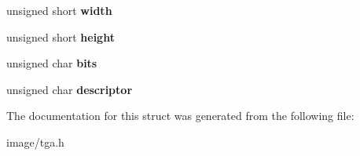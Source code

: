 \begin{DoxyCompactItemize}
\item 
\hypertarget{structnih_1_1_t_g_a_header_ae261168d8904db36be4e1acf3498a040}{
unsigned short {\bfseries width}}
\label{structnih_1_1_t_g_a_header_ae261168d8904db36be4e1acf3498a040}

\item 
\hypertarget{structnih_1_1_t_g_a_header_ab8bd1d1e1917c727c92cfedf641b8edb}{
unsigned short {\bfseries height}}
\label{structnih_1_1_t_g_a_header_ab8bd1d1e1917c727c92cfedf641b8edb}

\item 
\hypertarget{structnih_1_1_t_g_a_header_ada0456b3d727e40e5165a18d7777a7a2}{
unsigned char {\bfseries bits}}
\label{structnih_1_1_t_g_a_header_ada0456b3d727e40e5165a18d7777a7a2}

\item 
\hypertarget{structnih_1_1_t_g_a_header_a5da0e5e8a4f77aeaec715d9749cd422e}{
unsigned char {\bfseries descriptor}}
\label{structnih_1_1_t_g_a_header_a5da0e5e8a4f77aeaec715d9749cd422e}

\end{DoxyCompactItemize}


\-The documentation for this struct was generated from the following file\-:\begin{DoxyCompactItemize}
\item 
image/tga.\-h\end{DoxyCompactItemize}
